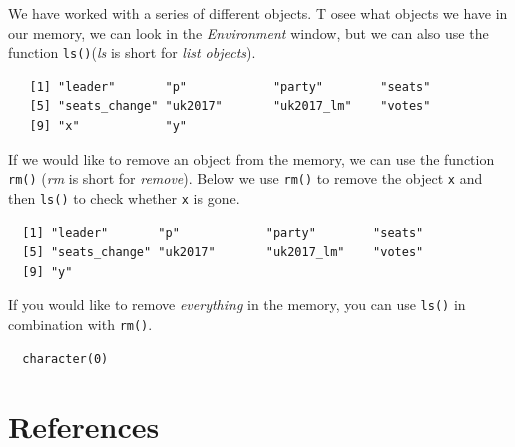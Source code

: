 \documentclass[12pt,oneside]{reedthesis}
\theoremstyle{definition}
\theoremstyle{definition}
\theoremstyle{definition}
\theoremstyle{remark}
\begin{document}
  We have worked with a series of different objects. T osee what objects
  we have in our memory, we can look in the \emph{Environment} window, but
  we can also use the function \texttt{ls()}(\emph{ls} is short for
  \emph{list objects}).
  \begin{Shaded}
  \begin{Highlighting}[]
  \NormalTok{()}
  \end{Highlighting}
  \end{Shaded}
  \begin{verbatim}
   [1] "leader"       "p"            "party"        "seats"       
   [5] "seats_change" "uk2017"       "uk2017_lm"    "votes"       
   [9] "x"            "y"           
  \end{verbatim}
  If we would like to remove an object from the memory, we can use the
  function \texttt{rm()} (\emph{rm} is short for \emph{remove}). Below we
  use \texttt{rm()} to remove the object \texttt{x} and then \texttt{ls()}
  to check whether \texttt{x} is gone.
  \begin{Shaded}
  \begin{Highlighting}[]
  
  \NormalTok{()}
  \end{Highlighting}
  \end{Shaded}
  \begin{verbatim}
  [1] "leader"       "p"            "party"        "seats"       
  [5] "seats_change" "uk2017"       "uk2017_lm"    "votes"       
  [9] "y"           
  \end{verbatim}
  If you would like to remove \emph{everything} in the memory, you can use
  \texttt{ls()} in combination with \texttt{rm()}.
  \begin{Shaded}
  \begin{Highlighting}[]
  \NormalTok{(} \NormalTok{())}
  
  \NormalTok{()}
  \end{Highlighting}
  \end{Shaded}
  \begin{verbatim}
  character(0)
  \end{verbatim}
  \backmatter
  
  \chapter{References}\label{references}
  
\end{document}
